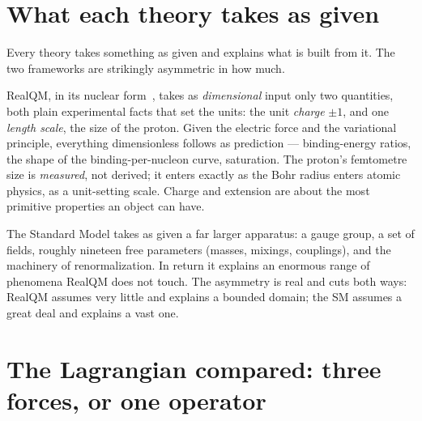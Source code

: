 \documentclass[11pt]{article}
\begin{document}
\section{What each theory takes as given}
\label{sec:given}

Every theory takes something as given and explains what is built from it. The two frameworks are strikingly
asymmetric in how much.

RealQM, in its nuclear form~\cite{RealNucleus}, takes as \emph{dimensional} input only two quantities, both
plain experimental facts that set the units: the unit \emph{charge} $\pm1$, and one \emph{length scale},
the size of the proton. Given the electric force and the variational principle, everything dimensionless
follows as prediction --- binding-energy ratios, the shape of the binding-per-nucleon curve, saturation.
The proton's femtometre size is \emph{measured}, not derived; it enters exactly as the Bohr radius enters
atomic physics, as a unit-setting scale. Charge and extension are about the most primitive properties an
object can have.

The Standard Model takes as given a far larger apparatus: a gauge group, a set of fields, roughly nineteen
free parameters (masses, mixings, couplings), and the machinery of renormalization. In return it explains
an enormous range of phenomena RealQM does not touch. The asymmetry is real and cuts both ways: RealQM
assumes very little and explains a bounded domain; the SM assumes a great deal and explains a vast one.

\section{The Lagrangian compared: three forces, or one operator}
\label{sec:lagrangian}
\end{document}
